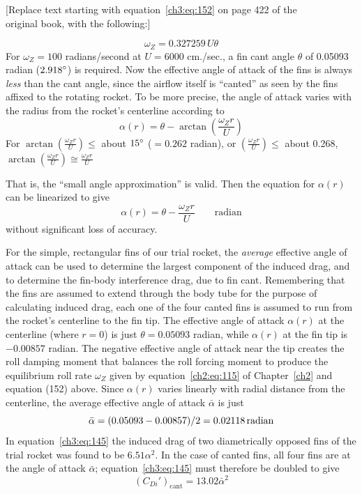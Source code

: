 \begin{center}
[Replace text starting with equation~\eqref{ch3:eq:152} on page 422 of the\\
original book, with the following:]
\end{center}
\begin{equation*}\tag{152}
\omega_Z = 0.327259\,U\theta
\end{equation*}
For $\omega_Z = 100$ radians/second at $U = 6000$ cm./sec., a fin cant angle $\theta$ of 0.05093
radian ($2.918^{\circ}$) is required. Now the effective angle of attack of the fins is always
\emph{less} than the cant angle, since the airflow itself is ``canted'' as seen by the fins affixed
to the rotating rocket. To be more precise, the angle of attack varies with the radius from the
rocket's centerline according to
\begin{equation*}
\alpha(r) = \theta - \arctan\left(\frac{\omega_Z r}{U}\right)
\end{equation*}
For $\arctan\left(\frac{\omega_Z r}{U}\right) \le$ about $15^{\circ}$ ($= 0.262$ radian), or
$\left(\frac{\omega_Z r}{U}\right) \le$ about 0.268,
$\arctan\left(\frac{\omega_Z r}{U}\right) \cong \frac{\omega_Z r}{U}$

\medskip
\noindent That is, the ``small angle approximation'' is valid. Then the equation for $\alpha(r)$ can be
linearized to give
\begin{equation*}\tag{153}
\alpha(r) = \theta - \frac{\omega_Z r}{U} \qquad \text{radian}
\end{equation*}
without significant loss of accuracy.

For the simple, rectangular fins of our trial rocket, the \emph{average} effective angle of attack
can be used to determine the largest component of the induced drag, and to determine the fin-body
interference drag, due to fin cant. Remembering that the fins are assumed to extend through the
body tube for the purpose of calculating induced drag, each one of the four canted fins is assumed
to run from the rocket's centerline to the fin tip. The effective angle of attack $\alpha(r)$ at the
centerline (where $r = 0$) is just $\theta = 0.05093$ radian, while $\alpha(r)$ at the fin tip is
$-0.00857$ radian. The negative effective angle of attack near the tip creates the roll damping
moment that balances the roll forcing moment to produce the equilibrium roll rate $\omega_Z$ given
by equation~\eqref{ch2:eq:115} of Chapter~\ref{ch2} and equation (152) above. Since
$\alpha(r)$ varies linearly with radial distance from the centerline, the average effective angle
of attack $\bar{\alpha}$ is just
\begin{equation*}
\bar{\alpha} = (0.05093 - 0.00857)/2 = 0.02118\,\mathrm{radian}
\end{equation*}
In equation~\eqref{ch3:eq:145} the induced drag of two diametrically opposed fins of the trial
rocket was found to be $6.51\alpha^{2}$. In the case of canted fins, all four fins are at the angle
of attack $\bar{\alpha}$; equation~\eqref{ch3:eq:145} must therefore be doubled to give
\begin{equation*}\tag{154}
(C_{Di}')_{\mathrm{cant}} = 13.02\bar{\alpha}^{2}
\end{equation*}

